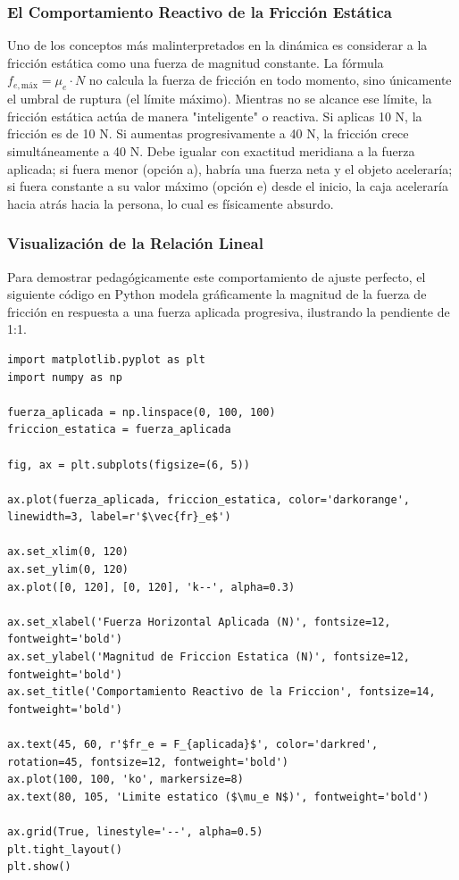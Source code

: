 \documentclass[12pt]{article}
\begin{document}
\subsubsection*{El Comportamiento Reactivo de la Fricción Estática}
Uno de los conceptos más malinterpretados en la dinámica es considerar a la fricción estática como una fuerza de magnitud constante. La fórmula $f_{e,\text{máx}} = \mu_e \cdot N$ no calcula la fuerza de fricción en todo momento, sino únicamente el umbral de ruptura (el límite máximo). 
Mientras no se alcance ese límite, la fricción estática actúa de manera "inteligente" o reactiva. Si aplicas 10 N, la fricción es de 10 N. Si aumentas progresivamente a 40 N, la fricción crece simultáneamente a 40 N. Debe igualar con exactitud meridiana a la fuerza aplicada; si fuera menor (opción a), habría una fuerza neta y el objeto aceleraría; si fuera constante a su valor máximo (opción e) desde el inicio, la caja aceleraría hacia atrás hacia la persona, lo cual es físicamente absurdo.

\subsubsection*{Visualización de la Relación Lineal}
Para demostrar pedagógicamente este comportamiento de ajuste perfecto, el siguiente código en Python modela gráficamente la magnitud de la fuerza de fricción en respuesta a una fuerza aplicada progresiva, ilustrando la pendiente de 1:1.

\begin{lstlisting}
import matplotlib.pyplot as plt
import numpy as np

fuerza_aplicada = np.linspace(0, 100, 100)
friccion_estatica = fuerza_aplicada 

fig, ax = plt.subplots(figsize=(6, 5))

ax.plot(fuerza_aplicada, friccion_estatica, color='darkorange', linewidth=3, label=r'$\vec{fr}_e$')

ax.set_xlim(0, 120)
ax.set_ylim(0, 120)
ax.plot([0, 120], [0, 120], 'k--', alpha=0.3) 

ax.set_xlabel('Fuerza Horizontal Aplicada (N)', fontsize=12, fontweight='bold')
ax.set_ylabel('Magnitud de Friccion Estatica (N)', fontsize=12, fontweight='bold')
ax.set_title('Comportamiento Reactivo de la Friccion', fontsize=14, fontweight='bold')

ax.text(45, 60, r'$fr_e = F_{aplicada}$', color='darkred', rotation=45, fontsize=12, fontweight='bold')
ax.plot(100, 100, 'ko', markersize=8)
ax.text(80, 105, 'Limite estatico ($\mu_e N$)', fontweight='bold')

ax.grid(True, linestyle='--', alpha=0.5)
plt.tight_layout()
plt.show()
\end{lstlisting}
\end{document}
